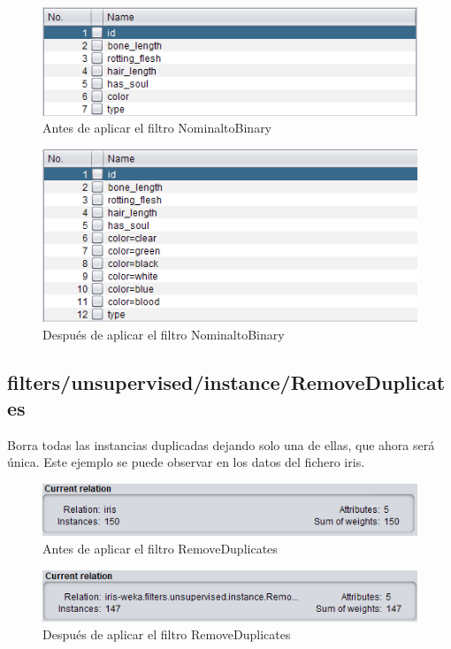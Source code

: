 \documentclass[11pt,twoside,a4paper]{book}
\begin{document}
\begin{figure}[H]
   \includegraphics[width=\textwidth]{NominaltoBinary1.png}
	\caption{Antes de aplicar el filtro NominaltoBinary}
	\label{Fig15}
\end{figure}
\begin{figure}[H]
   \includegraphics[width=\textwidth]{NominaltoBinary2.png}
	\caption{Después de aplicar el filtro NominaltoBinary}
	\label{Fig16}
\end{figure}

\subsection{filters/unsupervised/instance/RemoveDuplicates}
Borra todas las instancias duplicadas dejando solo una de ellas, que ahora será única. Este ejemplo se puede observar en los datos del fichero iris.

\begin{figure}[H]
   \includegraphics[width=\textwidth]{RemoveDuplicates1.png}
	\caption{Antes de aplicar el filtro RemoveDuplicates}
	\label{Fig17}
\end{figure}
\begin{figure}[H]
   \includegraphics[width=\textwidth]{RemoveDuplicates2.png}
	\caption{Después de aplicar el filtro RemoveDuplicates}
	\label{Fig18}
\end{figure}
\end{document}
